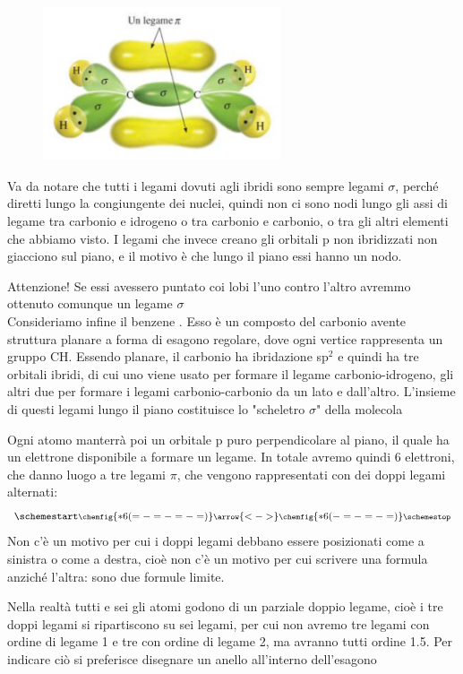 \begin{figure}[htp]
    \centering
    \includegraphics[width=7cm]{immagini/etene.png}
\end{figure}

Va da notare che tutti i legami dovuti agli ibridi sono sempre legami $\sigma$, perché diretti lungo la congiungente dei nuclei, quindi non ci sono nodi lungo gli assi di legame tra carbonio e idrogeno o tra carbonio e carbonio, o tra gli altri elementi che abbiamo visto. I legami che invece creano gli orbitali p non ibridizzati non giacciono sul piano, e il motivo è che lungo il piano essi hanno un nodo.

Attenzione! Se essi avessero puntato coi lobi l'uno contro l'altro avremmo ottenuto comunque un legame $\sigma$\\

Consideriamo infine il benzene . Esso è un composto del carbonio avente struttura planare a forma di esagono regolare, dove ogni vertice rappresenta un gruppo CH. Essendo planare, il carbonio ha ibridazione sp$^2$ e quindi ha tre orbitali ibridi, di cui uno viene usato per formare il legame carbonio-idrogeno, gli altri due per formare i legami carbonio-carbonio da un lato e dall'altro. L'insieme di questi legami lungo il piano costituisce lo "scheletro $\sigma$" della molecola

Ogni atomo manterrà poi un orbitale p puro perpendicolare al piano, il quale ha un elettrone disponibile a formare un legame. In totale avremo quindi 6 elettroni, che danno luogo a tre legami $\pi$, che vengono rappresentati con dei doppi legami alternati:
$$
\schemestart
\footnotesize\chemfig{*6(=-=-=-=)}
\arrow{<->}
\footnotesize\chemfig{*6(-=-=-=)}
\schemestop
$$
Non c'è un motivo per cui i doppi legami debbano essere posizionati come a sinistra o come a destra, cioè non c'è un motivo per cui scrivere una formula anziché l'altra: sono due formule limite.

Nella realtà tutti e sei gli atomi godono di un parziale doppio legame, cioè i tre doppi legami si ripartiscono su sei legami, per cui non avremo tre legami con ordine di legame 1 e tre con ordine di legame 2, ma avranno tutti ordine 1.5. Per indicare ciò si preferisce disegnare un anello all'interno dell'esagono
  
